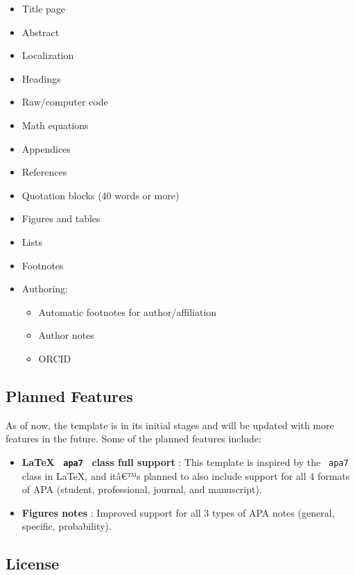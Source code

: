 \begin{itemize}
\tightlist
\item
  Title page
\item
  Abstract
\item
  Localization
\item
  Headings
\item
  Raw/computer code
\item
  Math equations
\item
  Appendices
\item
  References
\item
  Quotation blocks (40 words or more)
\item
  Figures and tables
\item
  Lists
\item
  Footnotes
\item
  Authoring:

  \begin{itemize}
  \tightlist
  \item
    Automatic footnotes for author/affiliation
  \item
    Author notes
  \item
    ORCID
  \end{itemize}
\end{itemize}

\subsection{Planned Features}\label{planned-features}

As of now, the template is in its initial stages and will be updated
with more features in the future. Some of the planned features include:

\begin{itemize}
\tightlist
\item
  \textbf{LaTeX \texttt{\ apa7\ } class full support} : This template is
  inspired by the \texttt{\ apa7\ } class in LaTeX, and itâ€™s planned
  to also include support for all 4 formats of APA (student,
  professional, journal, and manuscript).
\item
  \textbf{Figures notes} : Improved support for all 3 types of APA notes
  (general, specific, probability).
\end{itemize}

\subsection{License}\label{license}

